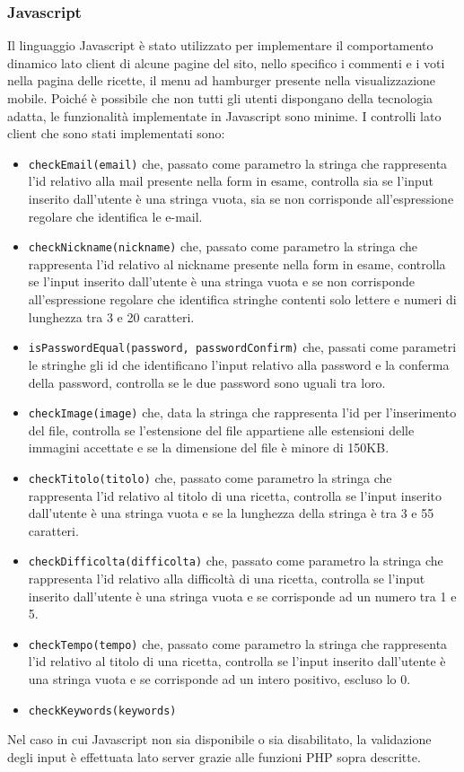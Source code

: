 \subsubsection{Javascript}\label{subs:javascript}
Il linguaggio Javascript è stato utilizzato per implementare il comportamento dinamico lato client di alcune pagine del sito, nello specifico i commenti e i voti nella pagina delle ricette, il menu ad hamburger presente nella visualizzazione mobile.
Poiché è possibile che non tutti gli utenti dispongano della tecnologia adatta, le funzionalità implementate in Javascript sono minime. \newline
I controlli lato client che sono stati implementati sono:
\begin{itemize}
	\item \texttt{checkEmail(email)} che, passato come parametro la stringa che rappresenta l'id relativo alla mail presente nella form in esame, controlla sia se l'input inserito dall'utente è una stringa vuota, sia se non corrisponde all'espressione regolare che identifica le e-mail.
	\item \texttt{checkNickname(nickname)} che, passato come parametro la stringa che rappresenta l'id relativo al nickname presente nella form in esame, controlla se l'input inserito dall'utente è una stringa vuota e se non corrisponde all'espressione regolare che identifica stringhe contenti solo lettere e numeri di lunghezza tra 3 e 20 caratteri.
	\item \texttt{isPasswordEqual(password, passwordConfirm)} che, passati come parametri le stringhe gli id che identificano l'input relativo alla password e la conferma della password, controlla se le due password sono uguali tra loro.
	\item \texttt{checkImage(image)} che, data la stringa che rappresenta l'id per l'inserimento del file, controlla se l'estensione del file appartiene alle estensioni delle immagini accettate e se la dimensione del file è minore di 150KB.
	\item \texttt{checkTitolo(titolo)} che, passato come parametro la stringa che rappresenta l'id relativo al titolo di una ricetta, controlla se l'input inserito dall'utente è una stringa vuota e se la lunghezza della stringa è tra 3 e 55 caratteri.
	\item \texttt{checkDifficolta(difficolta)} che, passato come parametro la stringa che rappresenta l'id relativo alla difficoltà di una ricetta, controlla se l'input inserito dall'utente è una stringa vuota e se corrisponde ad un numero tra 1 e 5.
	\item \texttt{checkTempo(tempo)} che, passato come parametro la stringa che rappresenta l'id relativo al titolo di una ricetta, controlla se l'input inserito dall'utente è una stringa vuota e se corrisponde ad un intero positivo, escluso lo 0.
	\item \texttt{checkKeywords(keywords)}
\end{itemize}
Nel caso in cui Javascript non sia disponibile o sia disabilitato, la validazione degli input è effettuata lato server grazie alle funzioni PHP sopra descritte.


